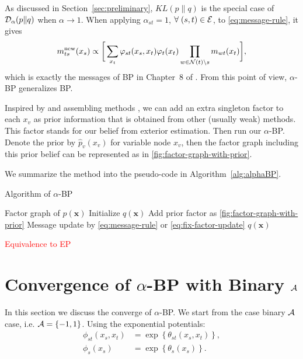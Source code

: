 \documentclass[conference,onecolumn]{IEEEtran}
\begin{document}
As discussed in Section~\ref{sec:preliminary}, $KL(p\|q)$ is the special case of $\mathcal{D}_{\alpha}(p\|q)$ when $\alpha \rightarrow 1$. When applying $\alpha_{st}=1$, $\forall\; (s,t) \in \mathcal{E}$, to \autoref{eq:message-rule}, it gives
\begin{equation}
  {m}^{\text{new}}_{ts}(x_s) \propto \bigg[
  \sum_{x_t} \varphi_{st}(x_s, x_t) {\varphi}_t(x_t) \prod_{w\in \mathcal{N}(t)\backslash s}m_{wt}(x_t) \bigg],
\end{equation}
which is exactly the messages of BP in Chapter~$8$ of \cite{Bishop:2006:PRM:1162264}. From this point of view, $\alpha$-BP generalizes BP.

Inspired by \cite{pseudo_priorBP2010} and assembling methods \cite{James:2014:ISL:2517747}, we can add an extra singleton factor to each $x_v$ as prior information that is obtained from other (usually weak) methods. This factor stands for our belief from exterior estimation. Then run our $\alpha$-BP. Denote the prior by $\hat{p}_v(x_v)$ for variable node $x_v$, then the factor graph including this prior belief can be represented as in \autoref{fig:factor-graph-with-prior}.

We summarize the method into the pseudo-code in Algorithm~\autoref{alg:alphaBP}.
\begin{algorithm}
  \caption{Algorithm of $\alpha$-BP}\label{alg:alphaBP}
  \begin{algorithmic}[1]
    \renewcommand{\algorithmicrequire}{\textbf{Input:}}
    \renewcommand{\algorithmicensure}{\textbf{Output:}}
    \REQUIRE Factor graph of $p(\bm{x})$
    \STATE Initialize $q(\bm{x})$
    \STATE Add prior factor as \autoref{fig:factor-graph-with-prior}
    \ENDIF
    \STATE Message update by \autoref{eq:message-rule} or \autoref{eq:fix-factor-update}
    \ENDFOR
    \ENDWHILE
    \RETURN $q(\bm{x})$ 
  \end{algorithmic} 
\end{algorithm}

\textcolor{red}{Equivalence to EP}
\section{Convergence of $\alpha$-BP with Binary $\mathcal{A}$}
In this section we discuss the converge of $\alpha$-BP. We start from
the case binary $\mathcal{A}$ case, i.e. $\mathcal{A}=\left\{ -1, 1 \right\}$. Using the exponential potentials:
\begin{align}
  \phi_{st}(x_s, x_t) &= \exp\left\{ \theta_{st}(x_s, x_t)\right\}, \\
  \phi_{s}(x_s) &= \exp\left\{ \theta_{s}(x_s) \right\}.
\end{align}
\end{document}
